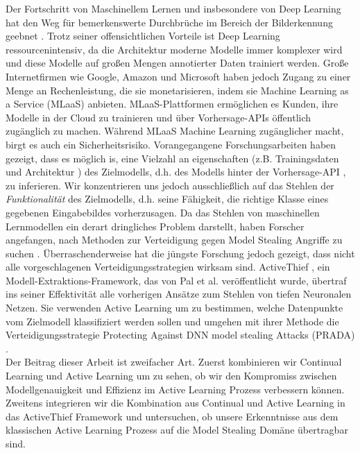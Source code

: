 
\Abstract
Der Fortschritt von Maschinellem Lernen und insbesondere von Deep Learning hat den Weg für bemerkenswerte Durchbrüche im Bereich der Bilderkennung geebnet \cite{he2016deep}
\cite{goodfellow2020generative} \cite{lecun1989backpropagation}. Trotz seiner offensichtlichen Vorteile ist Deep Learning ressourcenintensiv, da die Architektur moderne Modelle 
immer komplexer wird und diese Modelle auf großen Mengen annotierter Daten trainiert werden. Große Internetfirmen wie Google, Amazon und Microsoft haben jedoch Zugang zu einer 
Menge an Rechenleistung, die sie monetarisieren, indem sie Machine Learning as a Service (MLaaS) anbieten. MLaaS-Plattformen ermöglichen es Kunden, ihre Modelle in der Cloud
zu trainieren und über Vorhersage-APIs öffentlich zugänglich zu machen. Während MLaaS Machine Learning zugänglicher macht, birgt es auch ein Sicherheitsrisiko. Vorangegangene
Forschungsarbeiten haben gezeigt, dass es möglich is, eine Vielzahl an eigenschaften (z.B. Trainingsdaten \cite{shokri2017membership} und Architektur \cite{oh2019towards}) des
Zielmodells, d.h. des Modells hinter der Vorhersage-API \cite{tramer2016stealing} \cite{papernot2017practical}, zu inferieren. Wir konzentrieren uns jedoch ausschließlich auf
das Stehlen der \textit{Funktionalität} des Zielmodells, d.h. seine Fähigkeit, die richtige Klasse eines gegebenen Eingabebildes vorherzusagen. Da das Stehlen von maschinellen
Lernmodellen ein derart dringliches Problem darstellt, haben Forscher angefangen, nach Methoden zur Verteidigung gegen Model Stealing Angriffe zu suchen \cite{orekondy2019prediction}
\cite{juuti2019prada}. Überraschenderweise hat die jüngste Forschung jedoch gezeigt, dass nicht alle vorgeschlagenen Verteidigungsstrategien wirksam sind. ActiveThief \cite{pal2020activethief},
ein Modell-Extraktions-Framework, das von Pal et al. veröffentlicht wurde, übertraf ins seiner Effektivität alle vorherigen Ansätze zum Stehlen von tiefen Neuronalen Netzen. Sie verwenden
Active Learning um zu bestimmen, welche Datenpunkte vom Zielmodell klassifiziert werden sollen und umgehen mit ihrer Methode die Verteidigungsstrategie Protecting Against DNN model stealing
Attacks (PRADA) \cite{juuti2019prada}. \\
Der Beitrag dieser Arbeit ist zweifacher Art. Zuerst kombinieren wir Continual Learning und Active Learning um zu sehen, ob wir den Kompromiss zwischen Modellgenauigkeit und Effizienz im 
Active Learning Prozess verbessern können. Zweitens integrieren wir die Kombination aus Continual und Active Learning in das ActiveThief Framework und untersuchen, ob unsere Erkenntnisse aus
dem klassischen Active Learning Prozess auf die Model Stealing Domäne übertragbar sind.
